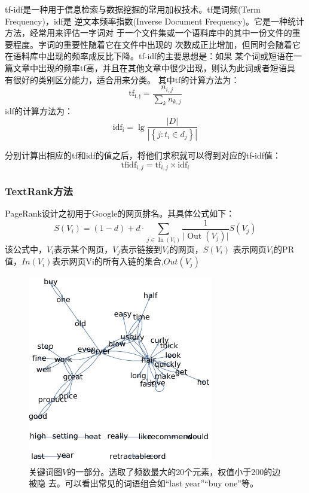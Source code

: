 tf-idf是一种用于信息检索与数据挖掘的常用加权技术。tf是词频(Term Frequency)，idf是
逆文本频率指数(Inverse Document Frequency)。它是一种统计方法，经常用来评估一字词对
于一个文件集或一个语料库中的其中一份文件的重要程度。字词的重要性随着它在文件中出现的
次数成正比增加，但同时会随着它在语料库中出现的频率成反比下降。tf-idf的主要思想是：如果
某个词或短语在一篇文章中出现的频率tf高，并且在其他文章中很少出现，则认为此词或者短语具
有很好的类别区分能力，适合用来分类。
其中tf的计算方法为：
\begin{equation}
    \mathrm{tf}_{\mathrm{i}, \mathrm{j}}=\frac{n_{i, j}}{\sum_{k} n_{k, j}}
\end{equation}
idf的计算方法为：
\begin{equation}
    \mathrm{idf}_{\mathrm{i}}=\lg \frac{|D|}{\left|\left\{j: t_{i} \in d_{j}\right\}\right|}
\end{equation}

分别计算出相应的tf和idf的值之后，将他们求积就可以得到对应的tf-idf值：
\begin{equation}
    \textrm{tfidf} _{i, j}=\textrm{tf}_{i, j} \times \textrm{idf}_{i}
\end{equation}

\subsubsection{TextRank方法}

PageRank设计之初用于Google的网页排名。其具体公式如下：
\begin{equation}
    S\left(V_{i}\right)=(1-d)+d \cdot \sum_{j \in \operatorname{In}\left(V_{i}\right)}
    \frac{1}{\lvert \operatorname{Out}\left(V_{j}\right)\rvert} S\left(V_{j}\right)
\end{equation}
该公式中，$V_{i}$表示某个网页，$V_{j}$表示链接到$V_{i}$的网页，$S\left(V_{i}\right)$
表示网页$V_{i}$的PR值，$I n\left(V_{i}\right)$表示网页Vi的所有入链的集合,$O u t\left(V_{j}\right)$

\begin{figure}
    \centering
    \includegraphics[scale=1.5]{figures/graph.pdf}
    \caption{关键词图$V$的一部分。{\fKai 选取了频数最大的20个元素，权值小于200的边被隐
    去。可以看出常见的词语组合如“last year”“buy one”等。}}
    \label{fig:textrank}
\end{figure}

